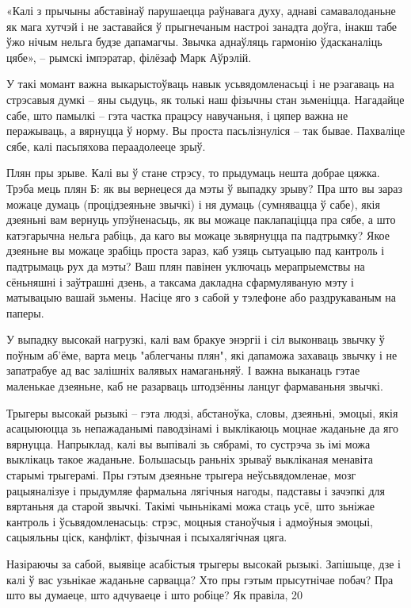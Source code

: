 «Калі з прычыны абставінаў парушаецца раўнавага духу, аднаві самавалоданьне як мага хутчэй і не заставайся ў прыгнечаным настроі занадта доўга, інакш табе ўжо нічым нельга будзе дапамагчы. Звычка аднаўляць гармонію ўдасканаліць цябе», – рымскі імпэратар, філёзаф Марк Аўрэлій.

У такі момант важна выкарыстоўваць навык усьвядомленасьці і не рэагаваць на стрэсавыя думкі – яны сыдуць, як толькі наш фізычны стан зьменіцца. Нагадайце сабе, што памылкі – гэта частка працэсу навучаньня, і цяпер важна не перажываць, а вярнуцца ў норму. Вы проста пасьлізнуліся – так бывае. Пахваліце сябе, калі пасьпяхова пераадолееце зрыў.

Плян пры зрыве. Калі вы ў стане стрэсу, то прыдумаць нешта добрае цяжка. Трэба мець плян Б: як вы вернецеся да мэты ў выпадку зрыву? Пра што вы зараз можаце думаць (процідзеяньне звычкі) і ня думаць (сумнявацца ў сабе), якія дзеяньні вам вернуць упэўненасьць, як вы можаце паклапаціцца пра сябе, а што катэгарычна нельга рабіць, да каго вы можаце зьвярнуцца па падтрымку? Якое дзеяньне вы можаце зрабіць проста зараз, каб узяць сытуацыю пад кантроль і падтрымаць рух да мэты? Ваш плян павінен уключаць мерапрыемствы на сёньняшні і заўтрашні дзень, а таксама дакладна сфармуляваную мэту і матывацыю вашай зьмены. Насіце яго з сабой у тэлефоне або раздрукаваным на паперы.

У выпадку высокай нагрузкі, калі вам бракуе энэргіі і сіл выконваць звычку ў поўным аб'ёме, варта мець "аблегчаны плян", які дапаможа захаваць звычку і не запатрабуе ад вас залішніх валявых намаганьняў. І важна выканаць гэтае маленькае дзеяньне, каб не разарваць штодзённы ланцуг фармаваньня звычкі.

Трыгеры высокай рызыкі – гэта людзі, абстаноўка, словы, дзеяньні, эмоцыі, якія асацыююцца зь непажаданымі паводзінамі і выклікаюць моцнае жаданьне да яго вярнуцца. Напрыклад, калі вы выпівалі зь сябрамі, то сустрэча зь імі можа выклікаць такое жаданьне. Большасьць раньніх зрываў выкліканая менавіта старымі трыгерамі. Пры гэтым дзеяньне трыгера неўсьвядомленае, мозг рацыяналізуе і прыдумляе фармальна лягічныя нагоды, падставы і зачэпкі для вяртаньня да старой звычкі. Такімі чыньнікамі можа стаць усё, што зьніжае кантроль і ўсьвядомленасьць: стрэс, моцныя станоўчыя і адмоўныя эмоцыі, сацыяльны ціск, канфлікт, фізычная і псыхалягічная цяга.

Назіраючы за сабой, выявіце асабістыя трыгеры высокай рызыкі. Запішыце, дзе і калі ў вас узьнікае жаданьне сарвацца? Хто пры гэтым прысутнічае побач? Пра што вы думаеце, што адчуваеце і што робіце? Як правіла, 20%

